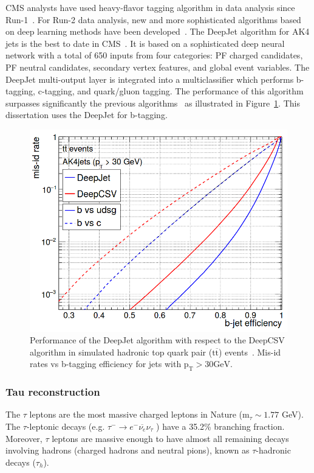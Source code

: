 CMS analysts have used heavy-flavor tagging algorithm in data analysis since Run-1~\cite{cmsbtagging8tev}. For Run-2 data analysis, new and more sophisticated algorithms based on deep learning methods have been developed~\cite{cmsbtagging13tev,cmsbtagging13tev2}. The DeepJet algorithm for AK4 jets is the best to date in CMS~\cite{cmsdeepjet}. It is based on a sophisticated deep neural network with a total of 650 inputs from four categories: PF charged candidates, PF neutral candidates, secondary vertex features, and global event variables. The DeepJet multi-output layer is integrated into a multiclassifier which performs b-tagging, c-tagging, and quark/gluon tagging. The performance of this algorithm surpasses significantly the previous algorithms~\cite{cmsbtag1} as illustrated in Figure~\ref{fig:deepjet}. This dissertation uses the DeepJet for b-tagging. 

\begin{figure}[ht!]
\centering
\captionsetup[subfigure]{justification=centering}
\includegraphics[width=1.0\textwidth]{Figures/Apparatus/deepjet.png}
\caption[Performance of the DeepJet algorithm with respect to the DeepCSV algorithm]{Performance of the DeepJet algorithm with respect to the DeepCSV algorithm in simulated hadronic top quark pair ($\mathrm{t\overline{t}}$) events~\cite{cmsdeepjet}. Mis-id rates vs b-tagging efficiency for jets with $\mathrm{p_{T} > 30 GeV}$.}
\label{fig:deepjet}
\end{figure}

\subsubsection{Tau reconstruction}
The $\tau$ leptons are the most massive charged leptons in Nature (m$_{\tau}\sim1.77$ GeV). The $\tau$-leptonic decays (e.g. $\tau^{-}\rightarrow e^{-} \overline{\nu_{e}}\nu_{\tau}$ ) have a 35.2\% branching fraction. Moreover, $\tau$ leptons are massive enough to have almost all remaining decays involving hadrons (charged hadrons and neutral pions), known as $\tau$-hadronic decays ($\tau_{h}$).

